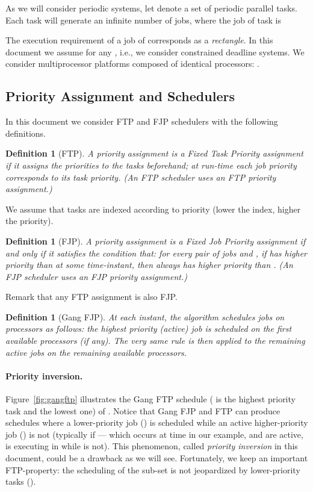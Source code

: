 \documentclass[a4paper]{article}
\newtheorem{definition}[theorem]{Definition}
\begin{document}
As we will consider periodic systems, let  denote a set of  periodic parallel tasks. Each task  will generate an infinite number of jobs, where the  job of task  is 


The execution requirement of a job of  corresponds as a  \emph{rectangle}.
In this document we assume  for any , i.e., we consider constrained deadline systems. We consider multiprocessor platforms  composed of  identical processors: . 




\subsection{Priority Assignment and Schedulers}

In this document we consider FTP and FJP schedulers with the following definitions.

\begin{definition}[FTP]
  A priority assignment  is a \emph{Fixed Task Priority}  assignment if it assigns the priorities to the tasks beforehand; at  run-time each job priority corresponds to its task priority. (An FTP scheduler uses an FTP priority assignment.)
\end{definition}

We assume that tasks are indexed according to priority (lower the index, higher the priority). 

\begin{definition}[FJP]
A priority assignment is a \emph{Fixed Job Priority}  assignment if and only if it satisfies the condition that: for every pair of jobs  and , if  has higher priority than  at some time-instant, then  always has higher priority than . (An FJP scheduler uses an FJP priority assignment.) 
\end{definition}

Remark that any FTP assignment is also FJP.



\begin{definition}[Gang FJP] At each instant, the algorithm schedules jobs on processors as follows: the highest priority (active) job  is scheduled on the first  available processors (if any). The very same rule is then applied to the remaining active jobs on the remaining available processors.
\end{definition}
\paragraph{Priority inversion.} Figure~\ref{fig:gangftp} illustrates the Gang FTP schedule ( is the highest priority task and  the lowest one) of . Notice that Gang FJP and FTP can produce schedules where a lower-priority job () is scheduled while an active higher-priority job () is not (typically if  --- which occurs at time  in our example,  and  are active,  is executing in  while  is not). This phenomenon, called \emph{priority inversion} in this document, could be a drawback as we will see. Fortunately, we keep an important FTP-property: the scheduling of the sub-set  is not jeopardized by lower-priority tasks ().
\end{document}
